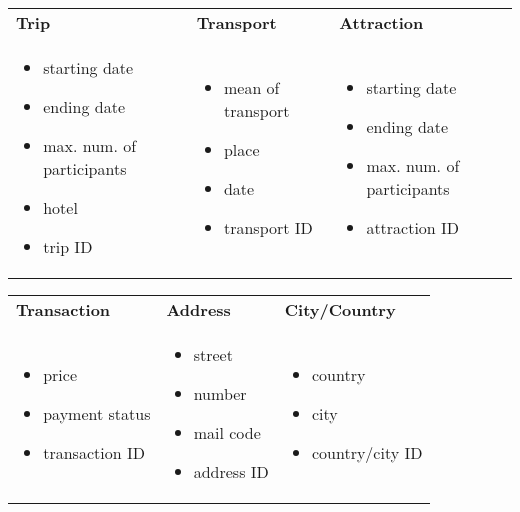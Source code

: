\documentclass{article}
\begin{document}
    \begin{tabular}{p{}p{}p{}}
        \textbf{Trip} & \textbf{Transport} & \textbf{Attraction}\\
        \begin{itemize}
            \item starting date
            \item ending date
            \item max. num. of participants
            \item hotel
            \item trip ID 
        \end{itemize} & \begin{itemize}
            \item mean of transport
            \item place
            \item date 
            \item transport ID
        \end{itemize} & \begin{itemize}
            \item starting date
            \item ending date
            \item max. num. of participants
            \item attraction ID
        \end{itemize}\\
    \end{tabular}
    \begin{tabular}{p{}p{}p{}}
        \textbf{Transaction} & \textbf{Address} & \textbf{City/Country}\\
        \begin{itemize}
            \item price
            \item payment status
            \item transaction ID
        \end{itemize} & \begin{itemize}
            \item street 
            \item number
            \item mail code
            \item address ID
        \end{itemize} & \begin{itemize}
            \item country
            \item city
            \item country/city ID
        \end{itemize}\\
    \end{tabular}      
\end{document}
